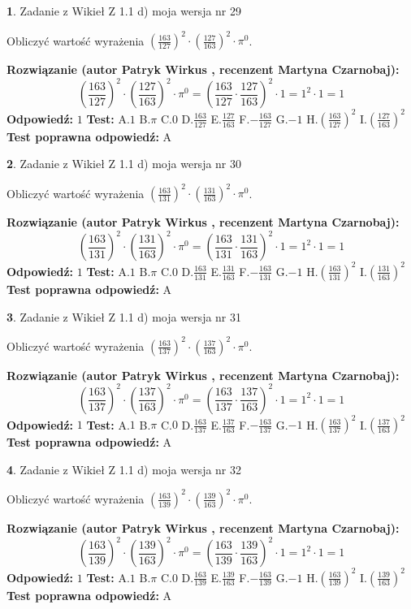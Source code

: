 \documentclass[12pt, a4paper]{article}
\theoremstyle{definition} %
\newtheorem{zad}{}
\newcommand{\zadStart}[1]{\begin{zad}#1\newline}
\newcommand{\zadStop}{\end{zad}}
\newcommand{\rozwStart}[2]{\noindent \textbf{Rozwiązanie (autor #1 , recenzent #2): }\newline}
\newcommand{\rozwStop}{\newline}
\newcommand{\odpStart}{\noindent \textbf{Odpowiedź:}\newline}
\newcommand{\odpStop}{\newline}
\newcommand{\testStart}{\noindent \textbf{Test:}\newline}
\newcommand{\testStop}{\newline}
\newcommand{\kluczStart}{\noindent \textbf{Test poprawna odpowiedź:}\newline}
\newcommand{\kluczStop}{\newline}
\begin{document}
\zadStart{Zadanie z Wikieł Z 1.1 d) moja wersja nr 29}

Obliczyć wartość wyrażenia $(\frac{163}{127})^{2} \cdot (\frac{127}{163})^{2} \cdot \pi^{0}$.
\zadStop
\rozwStart{Patryk Wirkus}{Martyna Czarnobaj}
$$(\frac{163}{127})^{2} \cdot (\frac{127}{163})^{2} \cdot \pi^{0} = (\frac{163}{127} \cdot \frac{127}{163})^{2} \cdot 1 = 1^{2} \cdot 1 = 1$$
\rozwStop
\odpStart
$1$
\odpStop
\testStart
A.$1$ B.$\pi$ C.$0$ D.$\frac{163}{127}$ E.$\frac{127}{163}$
F.$-\frac{163}{127}$ G.$-1$
H.$(\frac{163}{127})^{2}$
I.$(\frac{127}{163})^{2}$
\testStop
\kluczStart
A
\kluczStop



\zadStart{Zadanie z Wikieł Z 1.1 d) moja wersja nr 30}

Obliczyć wartość wyrażenia $(\frac{163}{131})^{2} \cdot (\frac{131}{163})^{2} \cdot \pi^{0}$.
\zadStop
\rozwStart{Patryk Wirkus}{Martyna Czarnobaj}
$$(\frac{163}{131})^{2} \cdot (\frac{131}{163})^{2} \cdot \pi^{0} = (\frac{163}{131} \cdot \frac{131}{163})^{2} \cdot 1 = 1^{2} \cdot 1 = 1$$
\rozwStop
\odpStart
$1$
\odpStop
\testStart
A.$1$ B.$\pi$ C.$0$ D.$\frac{163}{131}$ E.$\frac{131}{163}$
F.$-\frac{163}{131}$ G.$-1$
H.$(\frac{163}{131})^{2}$
I.$(\frac{131}{163})^{2}$
\testStop
\kluczStart
A
\kluczStop



\zadStart{Zadanie z Wikieł Z 1.1 d) moja wersja nr 31}

Obliczyć wartość wyrażenia $(\frac{163}{137})^{2} \cdot (\frac{137}{163})^{2} \cdot \pi^{0}$.
\zadStop
\rozwStart{Patryk Wirkus}{Martyna Czarnobaj}
$$(\frac{163}{137})^{2} \cdot (\frac{137}{163})^{2} \cdot \pi^{0} = (\frac{163}{137} \cdot \frac{137}{163})^{2} \cdot 1 = 1^{2} \cdot 1 = 1$$
\rozwStop
\odpStart
$1$
\odpStop
\testStart
A.$1$ B.$\pi$ C.$0$ D.$\frac{163}{137}$ E.$\frac{137}{163}$
F.$-\frac{163}{137}$ G.$-1$
H.$(\frac{163}{137})^{2}$
I.$(\frac{137}{163})^{2}$
\testStop
\kluczStart
A
\kluczStop



\zadStart{Zadanie z Wikieł Z 1.1 d) moja wersja nr 32}

Obliczyć wartość wyrażenia $(\frac{163}{139})^{2} \cdot (\frac{139}{163})^{2} \cdot \pi^{0}$.
\zadStop
\rozwStart{Patryk Wirkus}{Martyna Czarnobaj}
$$(\frac{163}{139})^{2} \cdot (\frac{139}{163})^{2} \cdot \pi^{0} = (\frac{163}{139} \cdot \frac{139}{163})^{2} \cdot 1 = 1^{2} \cdot 1 = 1$$
\rozwStop
\odpStart
$1$
\odpStop
\testStart
A.$1$ B.$\pi$ C.$0$ D.$\frac{163}{139}$ E.$\frac{139}{163}$
F.$-\frac{163}{139}$ G.$-1$
H.$(\frac{163}{139})^{2}$
I.$(\frac{139}{163})^{2}$
\testStop
\kluczStart
A
\kluczStop
\end{document}
